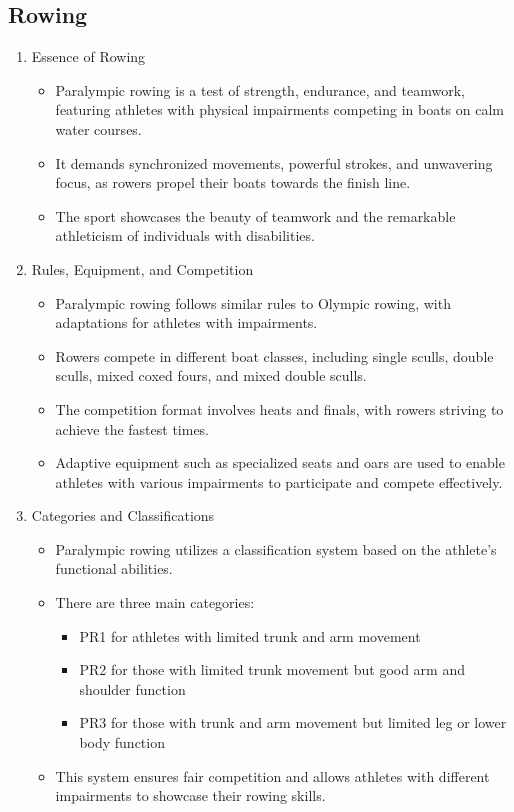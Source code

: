 \subsection{Rowing}

\begin{enumerate}

\item Essence of Rowing
    \begin{itemize}
    \item Paralympic rowing is a test of strength, endurance, and teamwork, featuring athletes with physical impairments competing in boats on calm water courses. 
    \item It demands synchronized movements, powerful strokes, and unwavering focus, as rowers propel their boats towards the finish line. 
    \item The sport showcases the beauty of teamwork and the remarkable athleticism of individuals with disabilities.
    \end{itemize}

\item Rules, Equipment, and Competition
    \begin{itemize}
    \item Paralympic rowing follows similar rules to Olympic rowing, with adaptations for athletes with impairments. 
    \item Rowers compete in different boat classes, including single sculls, double sculls, mixed coxed fours, and mixed double sculls. 
    \item The competition format involves heats and finals, with rowers striving to achieve the fastest times. 
    \item Adaptive equipment such as specialized seats and oars are used to enable athletes with various impairments to participate and compete effectively.
    \end{itemize}

\item Categories and Classifications
    \begin{itemize}
    \item Paralympic rowing utilizes a classification system based on the athlete's functional abilities. 
    \item There are three main categories: 
        \begin{itemize}
        \item PR1 for athletes with limited trunk and arm movement
        \item PR2 for those with limited trunk movement but good arm and shoulder function
        \item PR3 for those with trunk and arm movement but limited leg or lower body function
        \end{itemize}
    \item This system ensures fair competition and allows athletes with different impairments to showcase their rowing skills.
    \end{itemize}

\end{enumerate}
